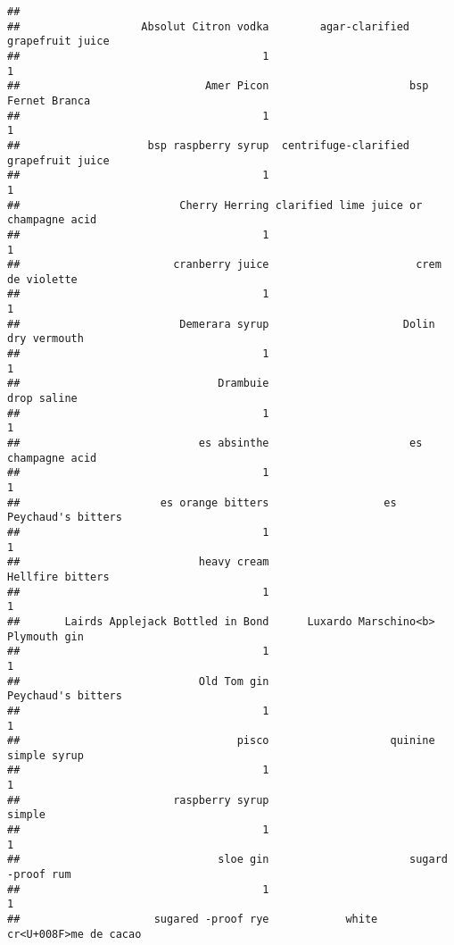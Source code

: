 \documentclass[
]{article}
\begin{document}
\begin{verbatim}
## 
##                   Absolut Citron vodka        agar-clarified grapefruit juice 
##                                      1                                      1 
##                             Amer Picon                      bsp Fernet Branca 
##                                      1                                      1 
##                    bsp raspberry syrup  centrifuge-clarified grapefruit juice 
##                                      1                                      1 
##                         Cherry Herring clarified lime juice or champagne acid 
##                                      1                                      1 
##                        cranberry juice                       crem de violette 
##                                      1                                      1 
##                         Demerara syrup                     Dolin dry vermouth 
##                                      1                                      1 
##                               Drambuie                            drop saline 
##                                      1                                      1 
##                            es absinthe                      es champagne acid 
##                                      1                                      1 
##                      es orange bitters                  es Peychaud's bitters 
##                                      1                                      1 
##                            heavy cream                       Hellfire bitters 
##                                      1                                      1 
##       Lairds Applejack Bottled in Bond      Luxardo Marschino<b> Plymouth gin 
##                                      1                                      1 
##                            Old Tom gin                     Peychaud's bitters 
##                                      1                                      1 
##                                  pisco                   quinine simple syrup 
##                                      1                                      1 
##                        raspberry syrup                                 simple 
##                                      1                                      1 
##                               sloe gin                      sugard -proof rum 
##                                      1                                      1 
##                     sugared -proof rye            white cr<U+008F>me de cacao 

\end{verbatim}
\end{document}
